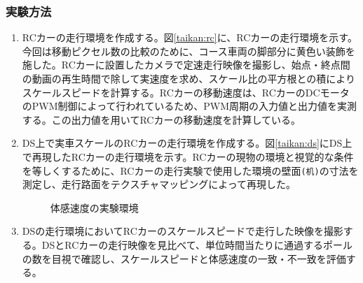 \subsubsection{実験方法}
\begin{enumerate}
  \item RCカーの走行環境を作成する。図\ref{taikan:rc}に、RCカーの走行環境を示す。今回は移動ピクセル数の比較のために、コース車両の脚部分に黄色い装飾を施した。RCカーに設置したカメラで定速走行映像を撮影し、始点・終点間の動画の再生時間で除して実速度を求め、スケール比の平方根との積によりスケールスピードを計算する。RCカーの移動速度は、RCカーのDCモータのPWM制御によって行われているため、PWM周期の入力値と出力値を実測する。この出力値を用いてRCカーの移動速度を計算している。
  \item DS上で実車スケールのRCカーの走行環境を作成する。図\ref{taikan:ds}にDS上で再現したRCカーの走行環境を示す。RCカーの現物の環境と視覚的な条件を等しくするために、RCカーの走行実験で使用した環境の壁面\verb|(机)|の寸法を測定し、走行路面をテクスチャマッピングによって再現した。
  \begin{figure}[h]
    \begin{center}
    \caption{体感速度の実験環境}
    \label{taikan:jikken1}
    \end{center}
  \end{figure}
  \item DSの走行環境においてRCカーのスケールスピードで走行した映像を撮影する。DSとRCカーの走行映像を見比べて、単位時間当たりに通過するポールの数を目視で確認し、スケールスピードと体感速度の一致・不一致を評価する。

\end{enumerate}
